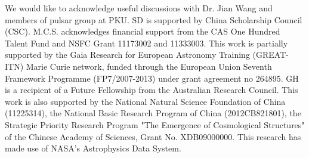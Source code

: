 \documentclass[iop,apj]{emulateapj}
\begin{document}
\acknowledgments

We would like to acknowledge useful discussions with Dr. Jian Wang and
members of pulsar group at PKU.
%
SD is supported by China Scholarship Council (CSC).
M.C.S. acknowledges financial support from the CAS One Hundred Talent
Fund and NSFC Grant 11173002 and 11333003. This work is partially supported by the
Gaia Research for European Astronomy Training (GREAT-ITN) Marie Curie
network, funded through the European Union Seventh Framework Programme
(FP7/2007-2013) under grant agreement no 264895.
%
GH is a recipient of a Future Fellowship from the Australian Research Council.
This work is also supported by the National Natural Science Foundation of
China (11225314), the National Basic Research Program of
China (2012CB821801), the Strategic Priority Research Program "The Emergence of 
Cosmological Structures" of the Chinese Academy of Sciences, Grant No. XDB09000000.
%
This research has made use of NASA's Astrophysics Data System.


\end{document}
